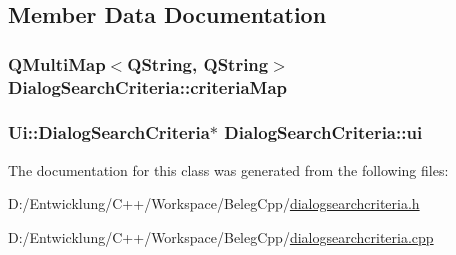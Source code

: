 \subsection{Member Data Documentation}
\hypertarget{class_dialog_search_criteria_a3ed8b9ec17d79f4e995926e2ba7e02b4}{
\subsubsection[{criteria\+Map}]{\setlength{\rightskip}{0pt plus 5cm}Q\+Multi\+Map$<$Q\+String, Q\+String$>$ Dialog\+Search\+Criteria\+::criteria\+Map\hspace{0.3cm}{\ttfamily [private]}}}\label{class_dialog_search_criteria_a3ed8b9ec17d79f4e995926e2ba7e02b4}
\hypertarget{class_dialog_search_criteria_a7e7d05c4b1937aec851d514e19182c50}{
\subsubsection[{ui}]{\setlength{\rightskip}{0pt plus 5cm}Ui\+::\+Dialog\+Search\+Criteria$\ast$ Dialog\+Search\+Criteria\+::ui\hspace{0.3cm}{\ttfamily [private]}}}\label{class_dialog_search_criteria_a7e7d05c4b1937aec851d514e19182c50}


The documentation for this class was generated from the following files\+:\begin{DoxyCompactItemize}
\item 
D\+:/\+Entwicklung/\+C++/\+Workspace/\+Beleg\+Cpp/\hyperlink{dialogsearchcriteria_8h}{dialogsearchcriteria.\+h}\item 
D\+:/\+Entwicklung/\+C++/\+Workspace/\+Beleg\+Cpp/\hyperlink{dialogsearchcriteria_8cpp}{dialogsearchcriteria.\+cpp}\end{DoxyCompactItemize}
